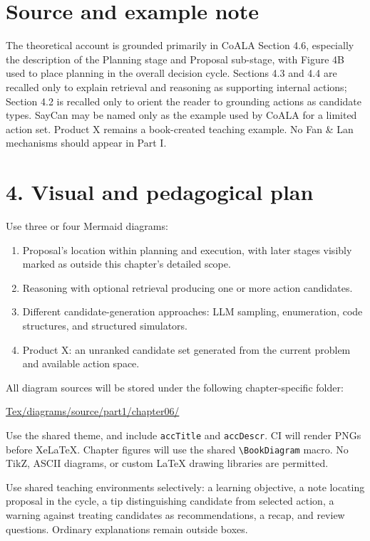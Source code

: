 \section*{Source and example note}
The theoretical account is grounded primarily in CoALA Section 4.6, especially the description of the Planning stage and Proposal sub-stage, with Figure 4B used to place planning in the overall decision cycle. Sections 4.3 and 4.4 are recalled only to explain retrieval and reasoning as supporting internal actions; Section 4.2 is recalled only to orient the reader to grounding actions as candidate types. SayCan may be named only as the example used by CoALA for a limited action set. Product X remains a book-created teaching example. No Fan \& Lan mechanisms should appear in Part I. 

\section*{4. Visual and pedagogical plan}
Use three or four Mermaid diagrams:
\begin{enumerate}
  \item Proposal's location within planning and execution, with later stages visibly marked as outside this chapter's detailed scope.
  \item Reasoning with optional retrieval producing one or more action candidates.
  \item Different candidate-generation approaches: LLM sampling, enumeration, code structures, and structured simulators.
  \item Product X: an unranked candidate set generated from the current problem and available action space.
\end{enumerate}

All diagram sources will be stored under the following chapter-specific folder:
\begin{center}\small\url{Tex/diagrams/source/part1/chapter06/}\end{center}
Use the shared theme, and include \texttt{accTitle} and \texttt{accDescr}. CI will render PNGs before XeLaTeX. Chapter figures will use the shared \verb|\BookDiagram| macro. No TikZ, ASCII diagrams, or custom LaTeX drawing libraries are permitted.

Use shared teaching environments selectively: a learning objective, a note locating proposal in the cycle, a tip distinguishing candidate from selected action, a warning against treating candidates as recommendations, a recap, and review questions. Ordinary explanations remain outside boxes.

